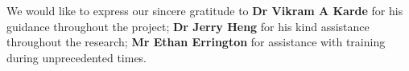 We would like to express our sincere gratitude to \textbf{Dr Vikram A Karde} for his guidance throughout the project; \textbf{Dr Jerry Heng} for his kind assistance throughout the research; \textbf{Mr Ethan Errington} for assistance with training during unprecedented times. 